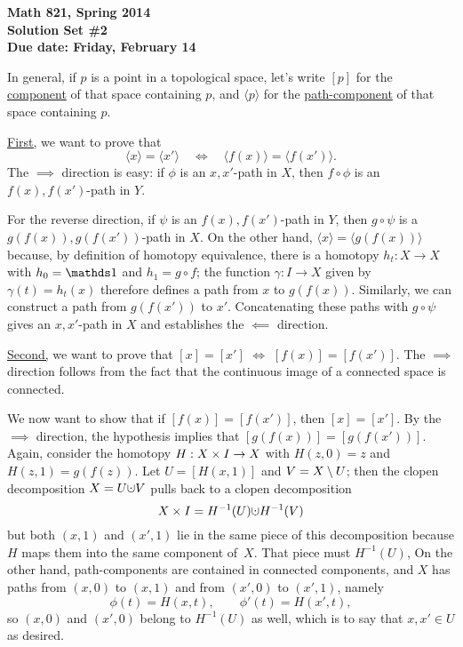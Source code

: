 
\usepackage{youngtab}

\thispagestyle{empty}
{\bf Math 821, Spring 2014\\
Solution Set \#2\\
Due date: Friday, February 14}


\newcommand{\cpt}[1]{[{#1}]}
\newcommand{\pcpt}[1]{\langle{#1}\rangle}

\soln In general, if $p$ is a point in a topological space,
let's write $\cpt{p}$ for the \underline{component} of
that space containing $p$, and $\pcpt{p}$ for the \underline{path-component} of
that space containing $p$.

\underline{First,} we want to prove that
\[\pcpt{x}=\pcpt{x'} \quad\iff\quad \pcpt{f(x)}=\pcpt{f(x')}.\]
The $\implies$ direction is easy: if $\phi$ is an $x,x'$-path in $X$,
then $f\circ\phi$ is an $f(x),f(x')$-path in $Y$.

For the reverse direction, if $\psi$ is an $f(x),f(x')$-path in $Y$,
then $g\circ\psi$  is a $g(f(x)),g(f(x'))$-path in $X$.
On the other hand, $\pcpt{x}=\pcpt{g(f(x))}$
because, by definition of homotopy equivalence,
there is a homotopy $h_t:X\to X$ with $h_0=\IdMap$
and $h_1=g\circ f$; the function $\gamma:I\to X$
given by $\gamma(t)=h_t(x)$ therefore defines a path from $x$ to $g(f(x))$.
Similarly, we can construct a path from $g(f(x'))$ to $x'$.
Concatenating these paths with $g\circ\psi$ gives an $x,x'$-path
in $X$ and establishes the $\impliedby$ direction.

\underline{Second,} we want to prove that $\cpt{x}=\cpt{x'}$
$\iff$ $\cpt{f(x)}=\cpt{f(x')}$.  The $\implies$ direction
follows from the fact that the continuous image of a connected
space is connected.

We now want to show that if $\cpt{f(x)}=\cpt{f(x')}$, then
$\cpt{x}=\cpt{x'}$.
By the $\implies$ direction, the hypothesis implies that 
$\cpt{g(f(x))}=\cpt{g(f(x'))}$.  Again, consider the homotopy
$H:X\times I\to X$ with $H(z,0)=z$ and $H(z,1)=g(f(z))$.
Let $U=\cpt{H(x,1)}$ and $V=X\setminus U$;
then the clopen decomposition $X=U\dju V$
pulls back to a clopen decomposition
$$X\x I = H^{-1}(U) \dju H^{-1}(V)$$
but both $(x,1)$ and $(x',1)$ lie in the same piece
of this decomposition because
$H$ maps them into the same component of~$X$.
That piece must $H^{-1}(U)$,
On the other hand, path-components are contained in
connected components, and $X$ has paths
from $(x,0)$ to $(x,1)$ and from $(x',0)$ to $(x',1)$, namely
$$\phi(t)=H(x,t),\qquad \phi'(t)=H(x',t),$$
so $(x,0)$ and $(x',0)$ belong to $H^{-1}(U)$ as well,
which is to say that $x,x'\in U$ as desired.

